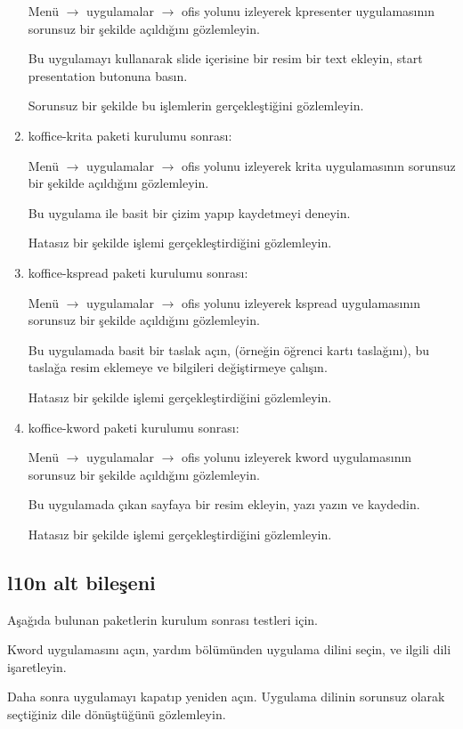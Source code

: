 \documentclass[a4paper,10pt]{article}
\begin{document}
\begin{enumerate}
Menü $\rightarrow$ uygulamalar $\rightarrow$ ofis yolunu izleyerek kpresenter uygulamasının sorunsuz bir şekilde açıldığını gözlemleyin.

Bu uygulamayı kullanarak slide içerisine bir resim bir text ekleyin, start presentation butonuna basın.

Sorunsuz bir şekilde bu işlemlerin gerçekleştiğini gözlemleyin.

\item koffice-krita paketi kurulumu sonrası:

Menü $\rightarrow$ uygulamalar $\rightarrow$ ofis yolunu izleyerek krita uygulamasının sorunsuz bir şekilde açıldığını gözlemleyin.

Bu uygulama ile basit bir çizim yapıp kaydetmeyi deneyin.

Hatasız bir şekilde işlemi gerçekleştirdiğini gözlemleyin.

\item koffice-kspread paketi kurulumu sonrası:

Menü $\rightarrow$ uygulamalar $\rightarrow$ ofis yolunu izleyerek kspread uygulamasının sorunsuz bir şekilde açıldığını gözlemleyin.

Bu uygulamada basit bir taslak açın, (örneğin öğrenci kartı taslağını), bu taslağa resim eklemeye ve bilgileri değiştirmeye çalışın.

Hatasız bir şekilde işlemi gerçekleştirdiğini gözlemleyin.

\item koffice-kword paketi kurulumu sonrası:

Menü $\rightarrow$ uygulamalar $\rightarrow$ ofis yolunu izleyerek kword uygulamasının sorunsuz bir şekilde açıldığını gözlemleyin.

Bu uygulamada çıkan sayfaya bir resim ekleyin, yazı yazın ve kaydedin.

Hatasız bir şekilde işlemi gerçekleştirdiğini gözlemleyin.
\end{enumerate}
\subsection*{l10n alt bileşeni}
Aşağıda bulunan paketlerin kurulum sonrası testleri için. 

Kword uygulamasını açın, yardım bölümünden uygulama dilini seçin, ve ilgili dili işaretleyin. 

Daha sonra uygulamayı kapatıp yeniden açın. Uygulama dilinin sorunsuz olarak seçtiğiniz dile dönüştüğünü gözlemleyin.
\end{document}
